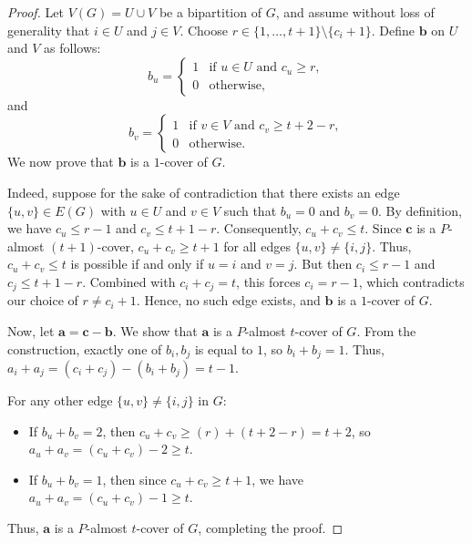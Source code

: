 \documentclass[10pt,a4paper]{amsart}
\begin{document}
\begin{proof}
Let $V(G) = U \cup V$ be a bipartition of $G$, and assume without loss of generality that $i \in U$ and $j \in V$. Choose $r \in \{1, \ldots, t+1\} \setminus \{c_i + 1\}$. Define $\mathbf{b}$ on $U$ and $V$ as follows:
\[
b_u = \begin{cases} 
1 & \text{if } u \in U \text{ and } c_u \ge r, \\
0 & \text{otherwise,} 
\end{cases}
\]
and
\[
b_v = \begin{cases} 
1 & \text{if } v \in V \text{ and } c_v \ge t + 2 - r, \\
0 & \text{otherwise.} 
\end{cases}
\]
We now prove that $\mathbf{b}$ is a $1$-cover of $G$.

Indeed, suppose for the sake of contradiction that there exists an edge $\{u,v\} \in E(G)$ with $u \in U$ and $v \in V$ such that $b_u = 0$ and $b_v = 0$. By definition, we have $c_u \le r - 1$ and $c_v \le t + 1 - r$. Consequently, $c_u + c_v \le t$. Since $\mathbf{c}$ is a $P$-almost $(t+1)$-cover, $c_u + c_v \ge t+1$ for all edges $\{u,v\} \neq \{i,j\}$. Thus, $c_u + c_v \le t$ is possible if and only if $u = i$ and $v = j$. But then $c_i \le r - 1$ and $c_j \le t + 1 - r$. Combined with $c_i + c_j = t$, this forces $c_i = r - 1$, which contradicts our choice of $r \neq c_i + 1$. Hence, no such edge exists, and $\mathbf{b}$ is a $1$-cover of $G$.

Now, let $\mathbf{a} = \mathbf{c} - \mathbf{b}$. We show that $\mathbf{a}$ is a $P$-almost $t$-cover of $G$. From the construction, exactly one of $b_i, b_j$ is equal to $1$, so $b_i + b_j = 1$. Thus, $a_i + a_j = (c_i + c_j) - (b_i + b_j) = t - 1$. 

For any other edge $\{u,v\} \neq \{i,j\}$ in $G$:
\begin{itemize}
    \item If $b_u + b_v = 2$, then $c_u + c_v \ge (r) + (t + 2 - r) = t + 2$, so $a_u + a_v = (c_u + c_v) - 2 \ge t$.
    \item If $b_u + b_v = 1$, then since $c_u + c_v \ge t + 1$, we have $a_u + a_v = (c_u + c_v) - 1 \ge t$.
\end{itemize}
Thus, $\mathbf{a}$ is a $P$-almost $t$-cover of $G$, completing the proof.
\end{proof}
\end{document}
